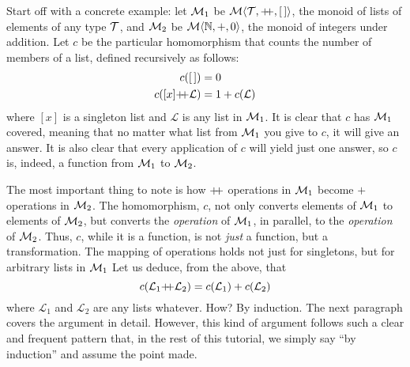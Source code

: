 Start off with a concrete example: let $\mathcal{M}_{1}$ be $\Mon{\T}{\pp}{\emptylist}$, the monoid of lists of elements of any type $\mathcal{T}$, and $\mathcal{M}_{2}$ be $\mathcal{M}\langle{\mathbb{N}},{+},{0}\rangle$, the monoid of integers under addition. Let $c$ be the particular homomorphism that counts the number of members of a list, defined recursively as follows:
\begin{align*}
  c(\emptylist)        & = 0 \\
  c([x]\pp\mathcal{L}) & = 1 + c(\mathcal{L})
\end{align*}
where $[x]$ is a singleton list and $\mathcal{L}$ is any list in $\mathcal{M}_{1}$. It is clear that $c$ has $\mathcal{M}_{1}$ covered, meaning that no matter what list from $\mathcal{M}_{1}$ you give to $c$, it will give an answer. It is also clear that every application of $c$ will yield just one answer, so $c$ is, indeed, a function from $\mathcal{M}_{1}$ to $\mathcal{M}_{2}$.

The most important thing to note is how $\pp$ operations in $\mathcal{M}_{1}$ become $+$ operations in $\mathcal{M}_{2}$. The homomorphism, $c$, not only converts elements of $\mathcal{M}_{1}$ to elements of $\mathcal{M}_{2}$, but converts the \emph{operation} of $\mathcal{M}_{1}$, in parallel, to the \emph{operation} of $\mathcal{M}_{2}$. Thus, $c$, while it is a function, is not \emph{just} a function, but a transformation. The mapping of operations holds not just for singletons, but for arbitrary lists in $\mathcal{M}_{1}$ Let us deduce, from the above, that
\begin{equation}
  c(\mathcal{L}_{1}\pp\mathcal{L}_{2})=c(\mathcal{L}_{1})+c(\mathcal{L}_{2})
  \label{eqn:inducl}
\end{equation}
where $\mathcal{L}_{1}$ and $\mathcal{L}_{2}$ are any lists whatever. How? By induction. The next paragraph covers the argument in detail. However, this kind of argument follows such a clear and frequent pattern that, in the rest of this tutorial, we simply say ``by induction'' and assume the point made.


